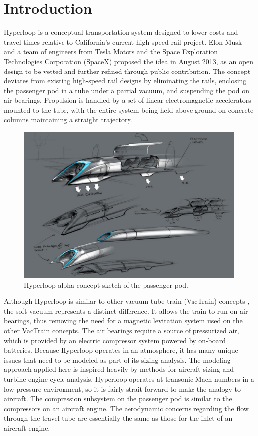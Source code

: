 \documentclass[heading.tex]{subfiles}
\begin{document}
\section{Introduction}

Hyperloop is a conceptual transportation system designed to lower costs and travel times relative to California’s current high-speed rail project.
\cite{Musk} Elon Musk and a team of engineers from Tesla Motors and the Space Exploration Technologies Corporation (SpaceX)
proposed the idea in August 2013, as an open design to be vetted and further refined through public contribution.
The concept deviates from existing high-speed rail designs by eliminating the rails, enclosing the passenger pod in a 
tube under a partial vacuum, and suspending the pod on air bearings. Propulsion is handled by a set of linear 
electromagnetic accelerators mounted to the tube, with the entire system being held above ground on concrete 
columns maintaining a straight trajectory.

\begin{figure}[hbtp]
\centering
\includegraphics[width=.75\textwidth]{images/hyperloopAlphaSketch.png}
 \caption[Hyperloop Concept Sketch]{Hyperloop-alpha concept sketch of the passenger pod. \cite{Musk}}
\label{f:hyperloopSketch}
\end{figure}

Although Hyperloop is similar to other vacuum tube train (VacTrain) concepts \cite{ET3}, the soft vacuum represents a distinct difference.
It allows the train to run on air-bearings, thus removing the need for a magnetic levitation system used on the other VacTrain concepts.
The air bearings require a source of pressurized air, which is provided by an electric compressor system powered by on-board batteries.
Because Hyperloop operates in an atmosphere, it has many unique issues that need to be modeled as part of its sizing analysis. 
The modeling approach applied here is inspired heavily by methods for aircraft sizing and turbine engine cycle analysis. Hyperloop 
operates at transonic Mach numbers in a low pressure environment, so it is fairly strait forward to make the analogy to aircraft. 
The compression subsystem on the passenger pod is similar to the compressors on an aircraft engine. The aerodynamic concerns  
regarding the flow through the travel tube are essentially the same as those for the inlet of an aircraft engine. 
\end{document}
